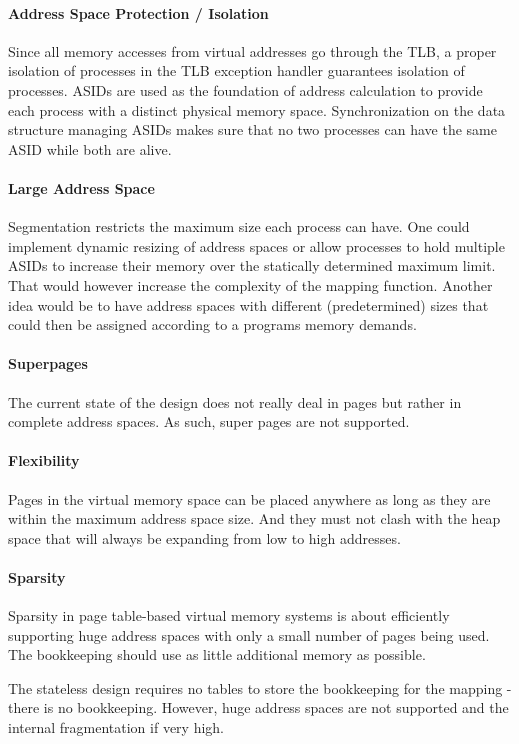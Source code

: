 \paragraph{Address Space Protection / Isolation} Since all memory accesses from virtual addresses go through the TLB, a proper isolation of processes in the TLB exception handler guarantees isolation of processes. ASIDs are used as the foundation of address calculation to provide each process with a distinct physical memory space.
Synchronization on the data structure managing ASIDs makes sure that no two processes can have the same ASID while both are alive.

\paragraph{Large Address Space} Segmentation restricts the maximum size each process can have. One could implement dynamic resizing of address spaces or allow processes to hold multiple ASIDs to increase their memory over the statically determined maximum limit.
That would however increase the complexity of the mapping function. Another idea would be to have address spaces with different (predetermined) sizes that could then be assigned according to a programs memory demands.

\paragraph{Superpages} The current state of the design does not really deal in pages but rather in complete address spaces. As such, super pages are not supported.

\paragraph{Flexibility} Pages in the virtual memory space can be placed anywhere as long as they are within the maximum address space size. And they must not clash with the heap space that will always be expanding from low to high addresses.

\paragraph{Sparsity} Sparsity in page table-based virtual memory systems is about efficiently
supporting huge address spaces with only a small number of pages being used. The bookkeeping should use as little additional memory as possible.

The stateless design requires no tables to store the bookkeeping for the mapping - there is no bookkeeping. However, huge address spaces are not supported and the internal fragmentation if very high.

